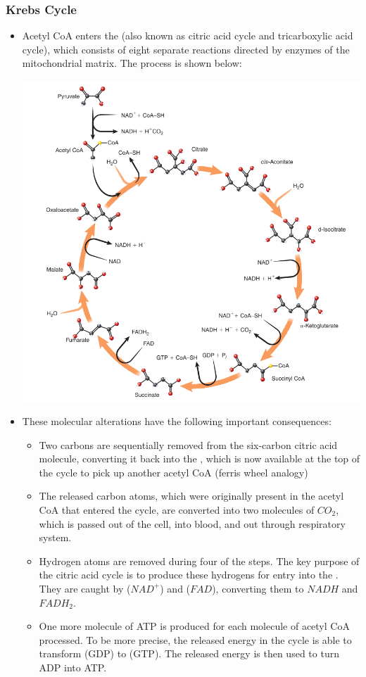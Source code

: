 \documentclass{article}
\numberwithin{equation}{section}
\begin{document}
\subsubsection{Krebs Cycle}
\begin{itemize}
    \item Acetyl CoA enters the  (also known as citric acid cycle and tricarboxylic acid cycle), which consists of eight separate reactions directed by enzymes of the mitochondrial matrix. The process is shown below:
    \begin{center}
        \includegraphics[width=0.6\linewidth]{figures/krebs.png}
    \end{center}
    \item These molecular alterations have the following important consequences:
    \begin{itemize}
        \item Two carbons are sequentially removed from the six-carbon citric acid molecule, converting it back into the , which is now available at the top of the cycle to pick up another acetyl CoA (ferris wheel analogy)
        \item The released carbon atoms, which were originally present in the acetyl CoA that entered the cycle, are converted into two molecules of $CO_2$, which is passed out of the cell, into blood, and out through respiratory system.
        \item Hydrogen atoms are removed during four of the steps. The key purpose of the citric acid cycle is to produce these hydrogens for entry into the . They are caught by  ($NAD^+$) and  ($FAD$), converting them to $NADH$ and $FADH_2$.
        \item One more molecule of ATP is produced for each molecule of acetyl CoA processed. To be more precise, the released energy in the cycle is able to transform  (GDP) to  (GTP). The released energy is then used to turn ADP into ATP.
    \end{itemize}
\end{itemize}
\end{document}
